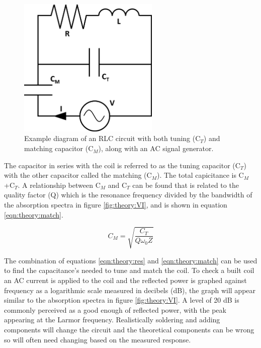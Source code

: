 \documentclass[class=article, crop=false]{standalone}
\begin{document}
\begin{figure}
    \centering
    \includegraphics[width=0.6\textwidth]{Figures/Theory/RLC_Circuit.png}
    \caption{Example diagram of an RLC circuit with both tuning (C$_T$) and matching capacitor (C$_M$), along with an AC signal generator.}
    \label{fig:theory:RLC}
\end{figure}

The capacitor in series with the coil is referred to as the tuning capacitor (C$_T$) with the other capacitor called the matching (C$_M$). The total capicitance is C$_M$+C$_T$. A relationship between C$_M$ and C$_T$ can be found that is related to the quality factor (Q)\cite{Chen1989ChapterNoise} which is the resonance frequency divided by the bandwidth of the absorption spectra in figure \ref{fig:theory:VI}, and is shown in equation \ref{eqn:theory:match}. 

\begin{equation}
    C_M = \sqrt{\frac{C_T}{Q\omega_0Z}}
    \label{eqn:theory:match}
\end{equation}

The combination of equations \ref{eqn:theory:res} and \ref{eqn:theory:match} can be used to find the capacitance's needed to tune and match the coil\cite{Chen1989ChapterNoise}. To check a built coil an AC current is applied to the coil and the reflected power is graphed against frequency as a logarithmic scale measured in decibels (dB), the graph will appear similar to the absorption spectra in figure \ref{fig:theory:VI}. A level of 20 dB is commonly perceived as a good enough of reflected power, with the peak appearing at the Larmor frequency. Realistically soldering and adding components will change the circuit and the theoretical components can be wrong so will often need changing based on the measured response.
\end{document}
